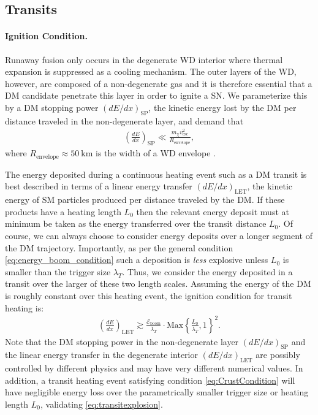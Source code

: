 \documentclass[preprintnumbers,amsmath,amssymb,prd,superscriptaddress]{revtex4}
\newcommand{\Eboom}{\mathcal{E}_\text{boom}}
\begin{document}

\subsection{Transits}

\paragraph{Ignition Condition.}
Runaway fusion only occurs in the degenerate WD interior where thermal expansion is suppressed as a cooling mechanism.
The outer layers of the WD, however, are composed of a non-degenerate gas and it is therefore essential that a DM candidate penetrate this layer in order to ignite a SN.
We parameterize this by a DM stopping power $(dE/dx)_\text{SP}$, the kinetic energy lost by the DM per distance traveled in the non-degenerate layer, and demand that
\begin{align}
\label{eq:CrustCondition}
  \left( \frac{d E}{d x} \right)_\text{SP} \ll
  \frac{m_\chi v^2_\text{esc}}{R_\text{envelope}},
\end{align}
where $R_\text{envelope} \approx 50 ~\text{km}$ is the width of a WD envelope \cite{KippenhahnWeigert}.

The energy deposited during a continuous heating event such as a DM transit is best described in terms of a linear energy transfer $(dE/dx)_\text{LET}$, the kinetic energy of SM particles produced per distance traveled by the DM.
If these products have a heating length $L_0$ then the relevant energy deposit must at minimum be taken as the energy transferred over the transit distance $L_0$.
Of course, we can always choose to consider energy deposits over a longer segment of the DM trajectory.
Importantly, as per the general condition \eqref{eq:energy_boom_condition} such a deposition is \emph{less} explosive unless $L_0$ is smaller than the trigger size $\lambda_T$.
Thus, we consider the energy deposited in a transit over the larger of these two length scales.
Assuming the energy of the DM is roughly constant over this heating event, the ignition condition for transit heating is:
\begin{align}
\label{eq:transitexplosion}
  \left( \frac{d E}{d x} \right)_\text{LET} \gtrsim
  \frac{\Eboom}{\lambda_T} \cdot \text{Max}
  \left\{\frac{L_0}{\lambda_T}, 1 \right\}^2.
\end{align}
Note that the DM stopping power in the non-degenerate layer $(dE/dx)_\text{SP}$ and the linear energy transfer in the degenerate interior $(dE/dx)_\text{LET}$ are possibly controlled by different physics and may have very different numerical values.
In addition, a transit heating event satisfying condition \eqref{eq:CrustCondition} will have negligible energy loss over the parametrically smaller trigger size or heating length $L_0$, validating \eqref{eq:transitexplosion}.
\end{document}
